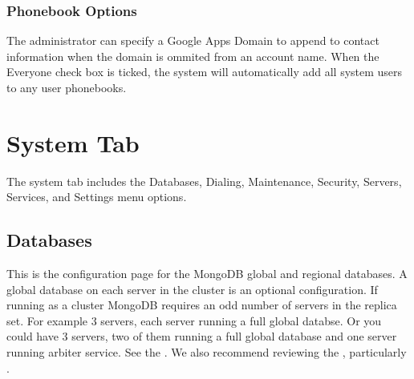 \documentclass[letterpaper,10pt,english]{sphinxmanual}
\begin{document}
\subsubsection{Phonebook Options}
\label{\detokenize{webui:phonebook-options}}
The administrator can specify a Google Apps Domain to append to contact information when the domain is ommited from an account name. When the Everyone check box is ticked, the system will automatically add all system users to any user phonebooks.
\begin{quote}

\end{quote}


\section{System Tab}
\label{\detokenize{webui:system-tab}}\label{\detokenize{webui:id18}}
The system tab includes the Databases, Dialing, Maintenance, Security, Servers, Services, and Settings menu options.
\begin{quote}

\end{quote}


\subsection{Databases}
\label{\detokenize{webui:databases}}\label{\detokenize{webui:id19}}
This is the configuration page for the MongoDB global and regional databases. A global database on each server in the cluster is an optional configuration. If running as a cluster MongoDB requires an odd number of servers in the replica set. For example 3 servers, each server running a full global databse. Or you could have 3 servers, two of them running a full global database and one server running arbiter service. See the  . We also recommend reviewing the , particularly .
\begin{quote}

\end{quote}
\end{document}
